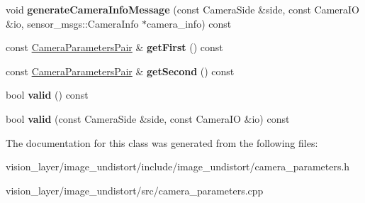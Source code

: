 \begin{DoxyCompactItemize}
void {\bfseries generate\+Camera\+Info\+Message} (const Camera\+Side \&side, const Camera\+IO \&io, sensor\+\_\+msgs\+::\+Camera\+Info $\ast$camera\+\_\+info) const
\item 
\mbox{\label{classimage__undistort_1_1StereoCameraParameters_affa22daa2fa2b4e3a21db48742b2657e}} 
const \hyperlink{classimage__undistort_1_1CameraParametersPair}{Camera\+Parameters\+Pair} \& {\bfseries get\+First} () const
\item 
\mbox{\label{classimage__undistort_1_1StereoCameraParameters_a41f953558ea5dba26aaa702d85e2c561}} 
const \hyperlink{classimage__undistort_1_1CameraParametersPair}{Camera\+Parameters\+Pair} \& {\bfseries get\+Second} () const
\item 
\mbox{\label{classimage__undistort_1_1StereoCameraParameters_ab877d6cd7f0d29ed7cab8cf7467a7a01}} 
bool {\bfseries valid} () const
\item 
\mbox{\label{classimage__undistort_1_1StereoCameraParameters_afc84c670ced12a5714bcf788b700d69d}} 
bool {\bfseries valid} (const Camera\+Side \&side, const Camera\+IO \&io) const
\end{DoxyCompactItemize}


The documentation for this class was generated from the following files\+:\begin{DoxyCompactItemize}
\item 
vision\+\_\+layer/image\+\_\+undistort/include/image\+\_\+undistort/camera\+\_\+parameters.\+h\item 
vision\+\_\+layer/image\+\_\+undistort/src/camera\+\_\+parameters.\+cpp\end{DoxyCompactItemize}
